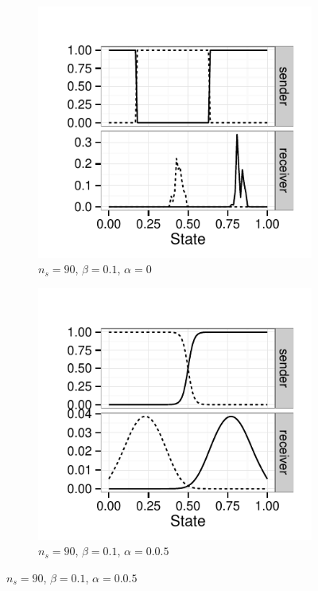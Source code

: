 \documentclass[fleqn,reqno,10pt]{article}
\newcommand{\imprecision}{\ensuremath{\alpha}} %
\newcommand{\toler}{\ensuremath{\beta}} %
\newcommand{\ns}{\ensuremath{n_s}} %
\begin{document}
\begin{figure}
  \centering

  \begin{subfigure}[]{0.45\textwidth}
    \includegraphics[width=\textwidth]{plots/strat_example_ind3098.pdf}
    \caption{$\ns = 90$, $\toler = 0.1$, $\imprecision = 0$}
    \label{fig:example_stratsA}
  \end{subfigure}
  \hfill
  \begin{subfigure}[]{0.45\textwidth}
    \includegraphics[width=\textwidth]{plots/strat_example_ind1.pdf}
    \caption{$\ns = 90$, $\toler = 0.1$, $\imprecision = 0.0.5$}
    \label{fig:example_stratsB}
  \end{subfigure}


\end{figure}
\end{document}
